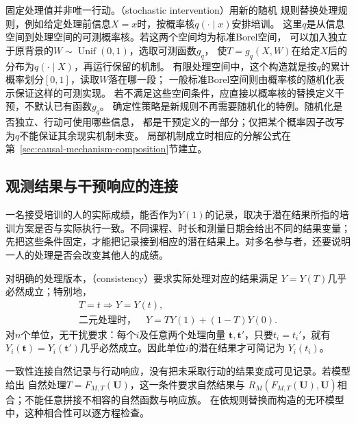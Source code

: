 固定处理值并非唯一行动。（stochastic intervention）用新的随机
规则替换处理规则，例如给定处理前信息\(X=x\)时，按概率核\(q(\cdot\mid x)\)安排培训。
这里\(q\)是从信息空间到处理空间的可测概率核。若这两个空间均为标准Borel空间，
可以加入独立于原背景的\(W\sim\operatorname{Unif}(0,1)\)，选取可测函数\(g_q\)，
使\(T=g_q(X,W)\)在给定\(X\)后的分布为\(q(\cdot\mid X)\)，再运行保留的机制。
有限处理空间中，这个构造就是按\(q\)的累计概率划分\([0,1]\)，读取\(W\)落在哪一段；
一般标准Borel空间则由概率核的随机化表示保证这样的可测实现。
若不满足这些空间条件，应直接以概率核的替换定义干预，不默认已有函数\(g_q\)。
确定性策略是新规则不再需要随机化的特例。随机化是否独立、行动可使用哪些信息，
都是干预定义的一部分；仅把某个概率因子改写为\(q\)不能保证其余现实机制未变。
局部机制成立时相应的分解公式在第~\ref{sec:causal-mechanism-composition}节建立。

\subsection{观测结果与干预响应的连接}
\label{sec:causal-response-observation-link}

一名接受培训的人的实际成绩，能否作为\(Y(1)\)的记录，取决于潜在结果所指的培训方案是否与实际执行一致。不同课程、时长和测量日期会给出不同的结果变量；先把这些条件固定，才能把记录接到相应的潜在结果上。对多名参与者，还要说明一人的处理是否会改变其他人的成绩。

\begin{definition}[处理一致性与无干扰]
  \label{def:causal-consistency-no-interference}
  对明确的处理版本，（consistency）要求实际处理对应的结果满足
  \(Y=Y(T)\)几乎必然成立；特别地，
  \begin{equation}
    \begin{gathered}
      T=t\Longrightarrow Y=Y(t),\\
      \text{二元处理时，}\quad Y=TY(1)+(1-T)Y(0).
    \end{gathered}
    \label{eq:causal-consistency}
  \end{equation}
  对\(n\)个单位，无干扰要求：每个\(i\)及任意两个处理向量
  \(\bm t,\bm t'\)，只要\(t_i=t_i'\)，就有
  \(Y_i(\bm t)=Y_i(\bm t')\)几乎必然成立。因此单位\(i\)的潜在结果才可简记为
  \(Y_i(t_i)\)。
\end{definition}

一致性连接自然记录与行动响应，没有把未采取行动的结果变成可见记录。若模型给出
自然处理\(T=F_{M,T}(\bm U)\)，这一条件要求自然结果与
\(R_M(F_{M,T}(\bm U),\bm U)\)相合；不能任意拼接不相容的自然函数与响应族。
在依规则替换而构造的无环模型中，这种相合性可以逐方程检查。

